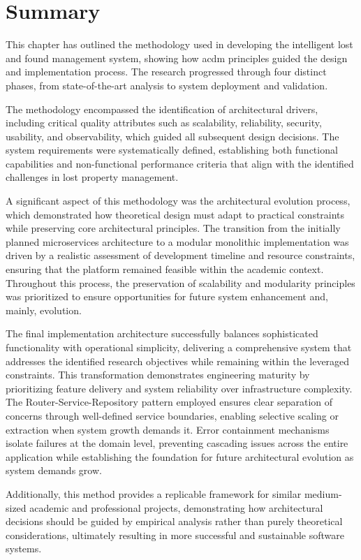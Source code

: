 \section{Summary} \label{section:methodology_summary}

This chapter has outlined the methodology used in developing the intelligent lost and found management system, showing how \ac{acdm} principles guided the design and implementation process. The research progressed through four distinct phases, from state-of-the-art analysis to system deployment and validation.

The methodology encompassed the identification of architectural drivers, including critical quality attributes such as scalability, reliability, security, usability, and observability, which guided all subsequent design decisions. The system requirements were systematically defined, establishing both functional capabilities and non-functional performance criteria that align with the identified challenges in lost property management.

A significant aspect of this methodology was the architectural evolution process, which demonstrated how theoretical design must adapt to practical constraints while preserving core architectural principles. The transition from the initially planned microservices architecture to a modular monolithic implementation was driven by a realistic assessment of development timeline and resource constraints, ensuring that the platform remained feasible within the academic context. Throughout this process, the preservation of scalability and modularity principles was prioritized to ensure opportunities for future system enhancement and, mainly, evolution.

The final implementation architecture successfully balances sophisticated functionality with operational simplicity, delivering a comprehensive system that addresses the identified research objectives while remaining within the leveraged constraints. This transformation demonstrates engineering maturity by prioritizing feature delivery and system reliability over infrastructure complexity. The Router-Service-Repository pattern employed ensures clear separation of concerns through well-defined service boundaries, enabling selective scaling or extraction when system growth demands it. Error containment mechanisms isolate failures at the domain level, preventing cascading issues across the entire application while establishing the foundation for future architectural evolution as system demands grow.

Additionally, this method provides a replicable framework for similar medium-sized academic and professional projects, demonstrating how architectural decisions should be guided by empirical analysis rather than purely theoretical considerations, ultimately resulting in more successful and sustainable software systems.
